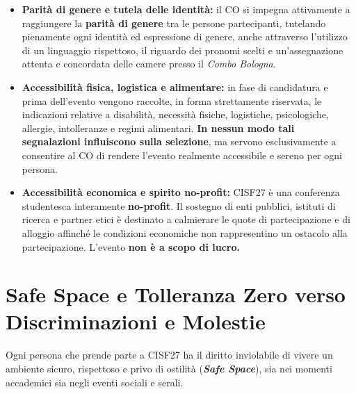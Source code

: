 \documentclass[10pt,a4paper]{article}
\begin{document}
\begin{itemize}
  \item \textbf{Parità di genere e tutela delle identità:} il CO si impegna attivamente a raggiungere la \textbf{parità di genere} tra le persone partecipanti, tutelando pienamente ogni identità ed espressione di genere, anche attraverso l'utilizzo di un linguaggio rispettoso, il riguardo dei pronomi scelti e un'assegnazione attenta e concordata delle camere presso il \textit{Combo Bologna}.
  \item \textbf{Accessibilità fisica, logistica e alimentare:} in fase di candidatura e prima dell'evento vengono raccolte, in forma strettamente riservata, le indicazioni relative a disabilità, necessità fisiche, logistiche, psicologiche, allergie, intolleranze e regimi alimentari. \textbf{In nessun modo tali segnalazioni influiscono sulla selezione}, ma servono esclusivamente a consentire al CO di rendere l'evento realmente accessibile e sereno per ogni persona.
  \item \textbf{Accessibilità economica e spirito no-profit:} CISF27 è una conferenza studentesca interamente \textbf{no-profit}. Il sostegno di enti pubblici, istituti di ricerca e partner etici è destinato a calmierare le quote di partecipazione e di alloggio affinché le condizioni economiche non rappresentino un ostacolo alla partecipazione. L'evento \textbf{non è a scopo di lucro.}
\end{itemize}

\clearpage

\section{Safe Space e Tolleranza Zero verso Discriminazioni e Molestie}

Ogni persona che prende parte a CISF27 ha il diritto inviolabile di vivere un ambiente sicuro, rispettoso e privo di ostilità (\textbf{\textit{Safe Space}}), sia nei momenti accademici sia negli eventi sociali e serali.
\end{document}
